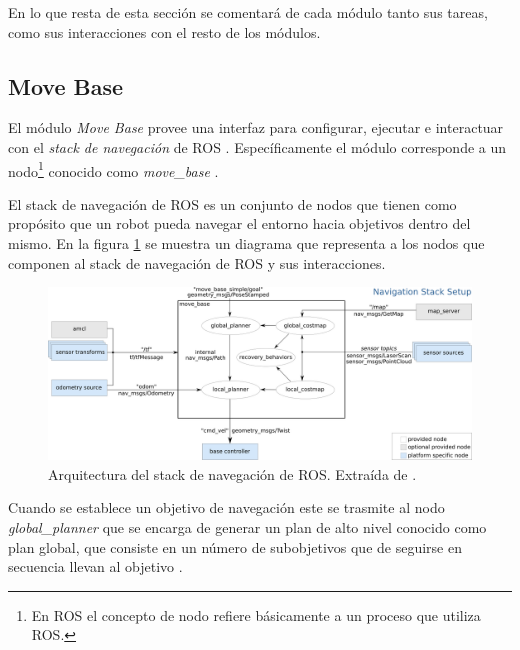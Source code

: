 En lo que resta de esta sección se comentará de cada módulo tanto sus tareas,
como sus interacciones con el resto de los módulos.

\subsection{Move Base}\label{subsec:move_base}
El módulo \emph{Move Base} provee una interfaz para configurar, ejecutar e
interactuar con el \emph{stack de navegación} de \gls{ROS}
\cite{ROS-navigation}. Específicamente el módulo corresponde a un
nodo\footnote{En \gls{ROS} el concepto de nodo refiere básicamente a un proceso que
  utiliza ROS.} conocido como \emph{move\_base}
  \cite{ROS-move_base}. 

El stack de navegación de \gls{ROS} es un conjunto de nodos que tienen como propósito
que un robot pueda navegar el entorno hacia objetivos dentro del mismo. En la
figura \ref{fig:move_base} se muestra un diagrama que representa a los nodos que
componen al stack de navegación de \gls{ROS} y sus interacciones.

\begin{figure}[H]
  \center
  \includegraphics[width=1\linewidth]{imagenes/move_base.png}
  \caption[Arquitectura del stack de navegación de ROS.]{Arquitectura del stack de navegación de \gls{ROS}. Extraída de \cite{ROS-move_base}.}
  \label{fig:move_base}
\end{figure} 

Cuando se establece un objetivo de navegación este se trasmite al nodo
\emph{global\_planner} que se encarga de generar un plan de alto nivel
conocido como plan global, que consiste en un número de subobjetivos que de
seguirse en secuencia llevan al objetivo .

